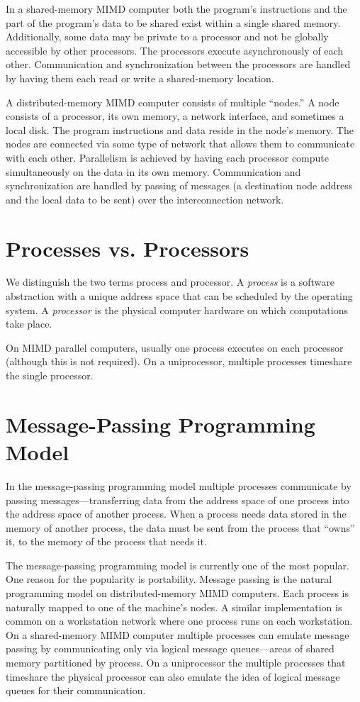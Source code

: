 \documentclass{report}
\begin{document}
In a shared-memory MIMD computer both the program's instructions and the part
of the program's data to be shared exist within a single shared memory.
Additionally, some data may be private to a processor and not be globally
accessible by other processors.  The processors execute asynchronously of each
other.  Communication and synchronization between the processors are handled
by having them each read or write a shared-memory location.

A distributed-memory MIMD computer consists of multiple ``nodes.''  A node
consists of a processor, its own memory, a network interface, and sometimes a
local disk.  The program instructions and data reside in the node's memory.
The nodes are connected via some type of network that allows them to
communicate with each other.  Parallelism is achieved by having each processor
compute simultaneously on the data in its own memory.  Communication and
synchronization are handled by passing of messages (a destination node address
and the local data to be sent) over the interconnection network.

\section*{Processes vs. Processors}

We distinguish the  two terms process and processor.  A {\em process} is a
software abstraction with a unique address space that can be scheduled by the
operating system.  A {\em processor} is the physical computer hardware on
which computations take place. 

On MIMD parallel computers, usually one process executes on
each processor (although this is not required).  On a uniprocessor,
multiple processes timeshare the single processor.


\section*{Message-Passing Programming Model}

In the message-passing programming model multiple processes communicate by
passing messages---trans\-ferring data from the address space of one process
into the address space of another process.  When a process needs data stored
in the memory of another process, the data must be sent from the process that
``owns'' it, to the memory of the process that needs it.

The message-passing programming model is currently one of the most popular.
One reason for the popularity is portability. Message passing is the natural
programming model on distributed-memory MIMD computers.  Each process is
naturally mapped to one of the machine's nodes.  A similar implementation is
common on a workstation network where one process runs on each workstation.
On a shared-memory MIMD computer multiple processes can emulate
message passing by communicating only via logical message queues---areas of
shared memory partitioned by process. On a uniprocessor the multiple processes
that timeshare the physical processor can also emulate the idea of 
logical message queues for their communication.
\end{document}
